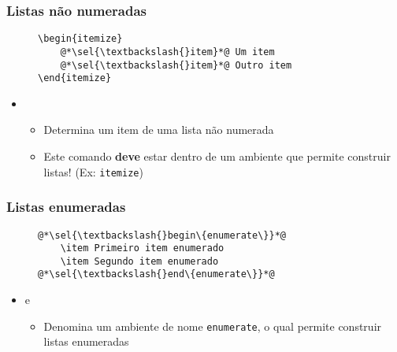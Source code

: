 \begin{frame}[fragile] \frametitle{Listas não numeradas}
\begin{figure}[!t]
\begin{lstlisting}
\begin{itemize}
	@*\sel{\textbackslash{}item}*@ Um item
	@*\sel{\textbackslash{}item}*@ Outro item
\end{itemize}
\end{lstlisting}
\end{figure}

\begin{itemize}
	\item {}
	\begin{itemize}
		\item Determina um item de uma lista não numerada
		\item Este comando \textbf{deve} estar dentro de um ambiente que permite construir listas! (Ex: \texttt{itemize})
	\end{itemize}
\end{itemize}
\end{frame}

\begin{frame}[fragile] \frametitle{Listas enumeradas}
\begin{figure}[!t]
\begin{lstlisting}
@*\sel{\textbackslash{}begin\{enumerate\}}*@
	\item Primeiro item enumerado
	\item Segundo item enumerado
@*\sel{\textbackslash{}end\{enumerate\}}*@
\end{lstlisting}
\end{figure}

\begin{itemize}
	\item {} e 
	\begin{itemize}
		\item Denomina um ambiente de nome \texttt{enumerate}, o qual permite construir listas enumeradas
	\end{itemize}
\end{itemize}
\end{frame}

